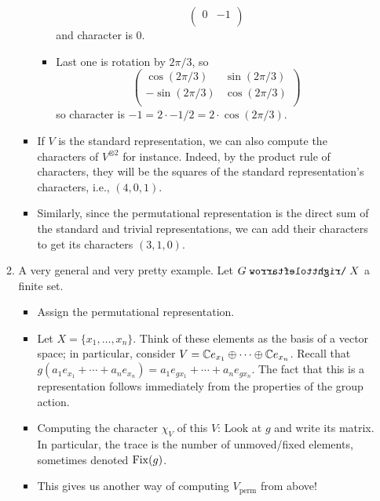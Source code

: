 \documentclass[../notes.tex]{subfiles}
\begin{document}
\begin{itemize}
\begin{enumerate}
\begin{itemize}
\begin{itemize}
\begin{equation*}
\begin{pmatrix}
                        0 & -1\\
                    \end{pmatrix}
                \end{equation*}
                and character is 0.
                \item Last one is rotation by $2\pi/3$, so
                \begin{equation*}
                    \begin{pmatrix}
                        \cos(2\pi/3) & \sin(2\pi/3)\\
                        -\sin(2\pi/3) & \cos(2\pi/3)\\
                    \end{pmatrix}
                \end{equation*}
                so character is $-1=2\cdot -1/2=2\cdot\cos(2\pi/3)$.
            \end{itemize}
            \item If $V$ is the standard representation, we can also compute the characters of $V^{\otimes 2}$ for instance. Indeed, by the product rule of characters, they will be the squares of the standard representation's characters, i.e., $(4,0,1)$.
            \item Similarly, since the permutational representation is the direct sum of the standard and trivial representations, we can add their characters to get its characters $(3,1,0)$.
        \end{itemize}
        \item A very general and very pretty example. Let $G\acts X$ a finite set.
        \begin{itemize}
            \item Assign the permutational representation.
            \item Let $X=\{x_1,\dots,x_n\}$. Think of these elements as the basis of a vector space; in particular, consider $V=\mathbb{C} e_{x_1}\oplus\cdots\oplus\mathbb{C} e_{x_n}$. Recall that $g(a_1e_{x_1}+\cdots+a_ne_{x_n})=a_1e_{gx_1}+\cdots+a_ne_{gx_n}$. The fact that this is a representation follows immediately from the properties of the group action.
            \item Computing the character $\chi_V$ of this $V$: Look at $g$ and write its matrix. In particular, the trace is the number of unmoved/fixed elements, sometimes denoted $\operatorname{Fix}(g)$.
            \item This gives us another way of computing $V_\text{perm}$ from above!
        \end{itemize}

\end{enumerate}
\end{itemize}
\end{document}
